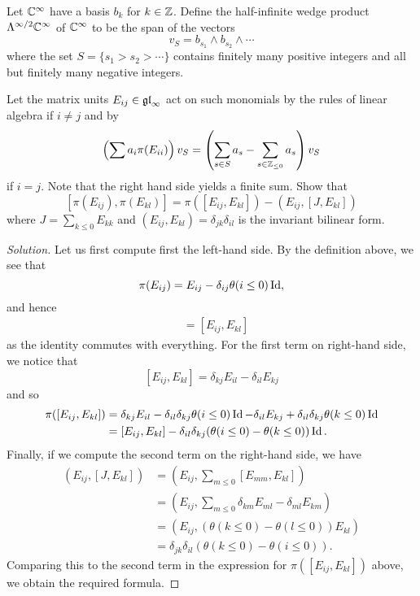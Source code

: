 \documentclass{../../mathnotes}
\begin{document}
\begin{exc}
    Let $\mathbb{C}^\infty$ have a basis $b_k$ for $k\in\mathbb{Z}$. Define the half-infinite wedge product $\Lambda^{\infty/2}\mathbb{C}^\infty$
    of $\mathbb{C}^\infty$ to be the span of the vectors
    \[v_S=b_{s_1}\wedge b_{s_2}\wedge \cdots\]
    where the set $S=\{s_1>s_2>\cdots\}$ contains finitely many positive integers and all but finitely
    many negative integers.

    Let the matrix units $E_{ij}\in\mathfrak{gl}_\infty$ act on such monomials by the rules of linear algebra if
    $i\neq j$ and by
    \[\left( \sum a_i\pi(E_{ii}) \right)v_S=\left( \sum_{s\in S}a_s-\sum_{s\in\mathbb{Z}_{\leq 0}}a_s \right)v_S\]
    if $i=j$. Note that the right hand side yields a finite sum. Show that
    \[ [\pi(E_{ij}),\pi(E_{kl})]=\pi([E_{ij},E_{kl}])-(E_{ij},[J,E_{kl}])\]
    where $J=\sum_{k\leq 0}E_{kk}$ and $(E_{ij},E_{kl})=\delta_{jk}\delta_{il}$ is the invariant bilinear form.
\end{exc}
\begin{proof}[Solution]
    Let us first compute first the left-hand side. By the definition above, we see that
    \[\pi(E_{ij})=E_{ij}-\delta_{ij}\theta(i\leq 0)\operatorname{Id},\]
    and hence
    \begin{align*}
        [\pi(E_{ij}),\pi(E_{kl})] &= [E_{ij},E_{kl}]
    \end{align*}
    as the identity commutes with everything. For the first term on right-hand side, we notice that
    \[ [E_{ij},E_{kl}]=\delta_{kj}E_{il}-\delta_{il}E_{kj} \]
    and so
    \begin{align*}
        \pi([E_{ij},E_{kl}])&=\delta_{kj}E_{il}-\delta_{il}\delta_{kj}\theta(i\leq 0)\operatorname{Id}-\delta_{il}E_{kj}+\delta_{il}\delta_{kj}\theta(k\leq 0)\operatorname{Id}\\
        &=[E_{ij},E_{kl}]-\delta_{il}\delta_{kj}(\theta(i\leq 0)-\theta(k\leq 0))\operatorname{Id}.
    \end{align*}
    Finally, if we compute the second term on the right-hand side, we have
    \begin{align*}
        (E_{ij},[J,E_{kl}]) &= \left(E_{ij},\sum_{m\leq 0}[E_{mm},E_{kl}]\right)\\
        &=\left(E_{ij},\sum_{m\leq 0}\delta_{km}E_{ml}-\delta_{ml}E_{km}\right)\\
        &=\left(E_{ij},(\theta(k\leq 0)-\theta(l\leq 0))E_{kl}\right)\\
        &=\delta_{jk}\delta_{il}\left( \theta(k\leq 0)-\theta(i\leq 0) \right).
    \end{align*}
    Comparing this to the second term in the expression for $\pi([E_{ij},E_{kl}])$ above, we obtain the
    required formula.
\end{proof}
\end{document}
